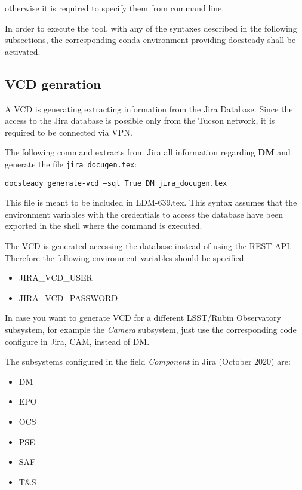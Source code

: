 \documentclass[DM]{lsstdoc}
\begin{document}
otherwise it is required to specify them from command line.

In order to execute the tool, with any of the syntaxes described in the following subsections, the corresponding conda environment providing docsteady shall be activated.



\subsection{VCD genration}

A VCD is generating extracting information from the Jira Database.
Since the access to the Jira database is possible only from the Tucson network, it is required to be connected via VPN.

The following command extracts from Jira all information regarding \textbf{DM} and generate the file \texttt{jira\_docugen.tex}:

\texttt{docsteady generate-vcd --sql True DM jira\_docugen.tex}

This file is meant to be included in LDM-639.tex.
This syntax assumes that the environment variables with the credentials to access the database have been exported in the shell where the command is executed.

The VCD is generated accessing the database instead of using the REST API. Therefore the following environment variables should be specified:

\begin{itemize}
\item JIRA\_VCD\_USER
\item JIRA\_VCD\_PASSWORD
\end{itemize}

In case you want to generate VCD for a different LSST/Rubin Observatory subsystem, for example the \textit{Camera} subsystem,
just use the corresponding code configure in Jira, CAM, instead of DM.

The subsystems configured in the field \textit{Component} in Jira (October 2020) are:
\begin{itemize}
\item DM
\item EPO
\item OCS
\item PSE
\item SAF
\item T&S
\end{itemize}
\end{document}
